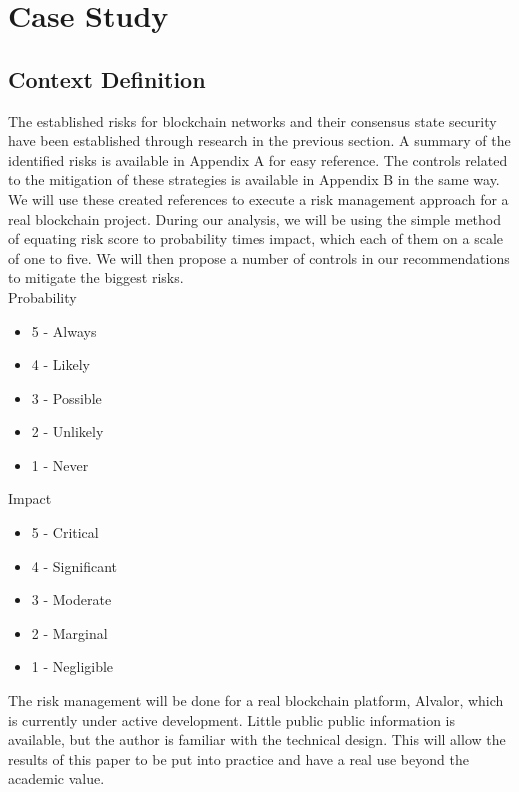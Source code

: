 \documentclass[11pt,a4paper]{article}
\begin{document}
\section{Case Study}

\subsection{Context Definition}

The established risks for blockchain networks and their consensus state security have been established through research in the previous section. A summary of the identified risks is available in Appendix A for easy reference. The controls related to the mitigation of these strategies is available in Appendix B in the same way.\\

We will use these created references to execute a risk management approach for a real blockchain project. During our analysis, we will be using the simple method of equating risk score to probability times impact, which each of them on a scale of one to five. We will then propose a number of controls in our recommendations to mitigate the biggest risks.\\

Probability
\begin{itemize}
  \item 5 - Always
  \item 4 - Likely
  \item 3 - Possible
  \item 2 - Unlikely
  \item 1 - Never
\end{itemize}

Impact
\begin{itemize}
  \item 5 - Critical
  \item 4 - Significant
  \item 3 - Moderate
  \item 2 - Marginal
  \item 1 - Negligible
\end{itemize}

The risk management will be done for a real blockchain platform, Alvalor, which is currently under active development. Little public public information is available, but the author is familiar with the technical design. This will allow the results of this paper to be put into practice and have a real use beyond the academic value.\\
\end{document}
